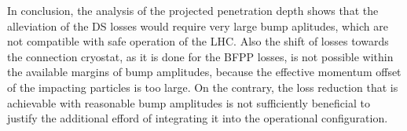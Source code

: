 In conclusion, the analysis of the projected penetration depth shows that the alleviation of the DS losses would require very large bump aplitudes, which are not compatible with safe operation of the LHC. Also the shift of losses towards the connection cryostat, as it is done for the BFPP losses, is not possible within the available margins of bump amplitudes, because the effective momentum offset of the impacting particles is too large. On the contrary, the loss reduction that is achievable with reasonable bump amplitudes is not sufficiently beneficial to justify the additional efford of integrating it into the operational configuration. 









%
%
%
%

